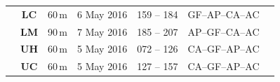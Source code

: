 \documentclass{sfuthesis}
\begin{document}
\begin{table}
\begin{tabular}{ccccccl}
                                                                             & \textbf{LC}                                                  & 60\,m                                                                     & 6 May 2016    & 159 -- 184                                                                 & GF--AP--CA--AC                                                     &                                                                                                                                                                                                                                                  \\
                                                                             & \textbf{LM}                                                  & 90\,m                                                                     & 7 May 2016    & 185 -- 207                                                                 & AP--GF--CA--AC                                                     &                                                                                                                                                                                                                                                  \\
                                                                             & \textbf{UH}                                                  & 60\,m                                                                     & 5 May 2016    & 072 -- 126                                                                 & CA--GF--AP--AC                                                     &                                                                                                                                                                                                                                                  \\
                                                                             & \textbf{UC}                                                  & 60\,m                                                                     & 5 May 2016    & 127 -- 157                                                                 & CA--GF--AP--AC                                                     &                                                                                                                                                                                                                                                  \\

\end{tabular}
\end{table}
\end{document}
